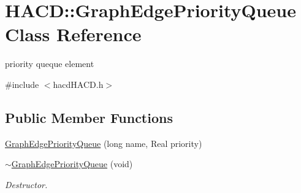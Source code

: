 \hypertarget{class_h_a_c_d_1_1_graph_edge_priority_queue}{\section{H\+A\+C\+D\+:\+:Graph\+Edge\+Priority\+Queue Class Reference}
\label{class_h_a_c_d_1_1_graph_edge_priority_queue}
}


priority queque element  




{\ttfamily \#include $<$hacd\+H\+A\+C\+D.\+h$>$}

\subsection*{Public Member Functions}
\begin{DoxyCompactItemize}
\item 
\hyperlink{class_h_a_c_d_1_1_graph_edge_priority_queue_a215becfc646220c254707f08a22a60d0}{Graph\+Edge\+Priority\+Queue} (long name, Real priority)
\item 
\hypertarget{class_h_a_c_d_1_1_graph_edge_priority_queue_a063521cb9eced22a5341aafe9359863f}{\hyperlink{class_h_a_c_d_1_1_graph_edge_priority_queue_a063521cb9eced22a5341aafe9359863f}{$\sim$\+Graph\+Edge\+Priority\+Queue} (void)}\label{class_h_a_c_d_1_1_graph_edge_priority_queue_a063521cb9eced22a5341aafe9359863f}

\begin{DoxyCompactList}\small\item\em Destructor. \end{DoxyCompactList}\end{DoxyCompactItemize}
